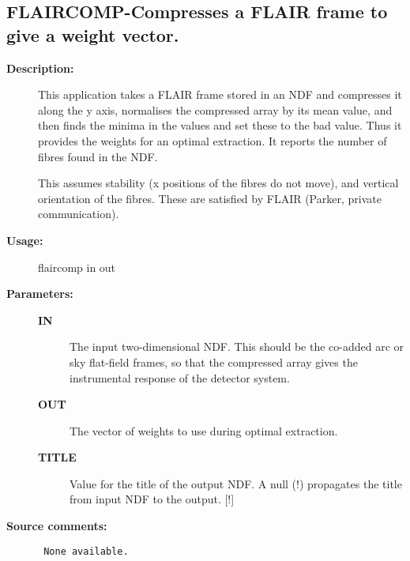 \subsection{FLAIRCOMP-\label{FLAIRCOMP}Compresses a FLAIR frame to give a weight vector.}
\begin{description}

\item [{\bf Description:}]
 This application takes a FLAIR frame stored in an NDF and
 compresses it along the y axis, normalises the compressed array
 by its mean value, and then finds the minima in the values and
 set these to the bad value.  Thus it provides the weights for an
 optimal extraction.  It reports the number of fibres found in the
 NDF.

 This assumes stability (x positions of the fibres do not move),
 and vertical orientation of the fibres.  These are satisfied by
 FLAIR (Parker, private communication).

\item [{\bf Usage:}]
 flaircomp in out


\item [{\bf Parameters:}]
\begin{description}
\item [{\bf IN}]
 The input two-dimensional NDF.  This should be the co-added
 arc or sky flat-field frames, so that the compressed array
 gives the instrumental response of the detector system.
\item [{\bf OUT}]
 The vector of weights to use during optimal extraction.
\item [{\bf TITLE}]
 Value for the title of the output NDF.  A null (!) propagates
 the title from input NDF to the output. [!]

\end{description}

\item [{\bf Source comments:}]
\begin{verbatim}
 None available.

\end{verbatim}
\end{description}
